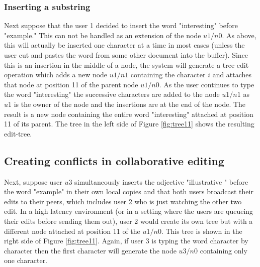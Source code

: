 \documentclass{amsart}
\begin{document}
\subsubsection{Inserting a substring}
Next suppose that the user 1 decided to insert the word "interesting"
before "example."  This can not be handled as an extension of the node
$u1/n0$.  As above, this will actually be inserted one character at a time
in most cases (unless the user cut and pastes the word from some other
document into the buffer). Since this is an insertion in the middle of a node,
the system will generate a tree-edit operation which adds a new node $u1/n1$
containing the character $i$ and attaches that node at position 11 of the
parent node $u1/n0$.  As the user continues to type the word "interesting"
the successive characters are added to the node $u1/n1$ as $u1$ is the owner
of the node and the insertions are at the end of the node. The result
is a new node containing the entire word "interesting" attached at position
11 of its parent. The tree in the left side of Figure \ref{fig:tree11}
shows the resulting edit-tree.



\subsection{Creating conflicts in collaborative editing}
Next, suppose user $u3$ 
simultaneously inserts the adjective "illustrative "
before the word "example" in their own
local copies and that both users broadcast their edits to their peers, which
includes user 2 who is just watching the other two edit.  
In a high latency environment (or in a setting where the users are queueing 
their edits before sending them out), user 2 would create its own tree
but with a different node attached at position 11 of the $u1/n0$. This tree
is shown in the right side of Figure \ref{fig:tree11}. Again, if user 3
is typing the word character by character then the first character will generate
the node $u3/n0$ containing only one character.
\end{document}
